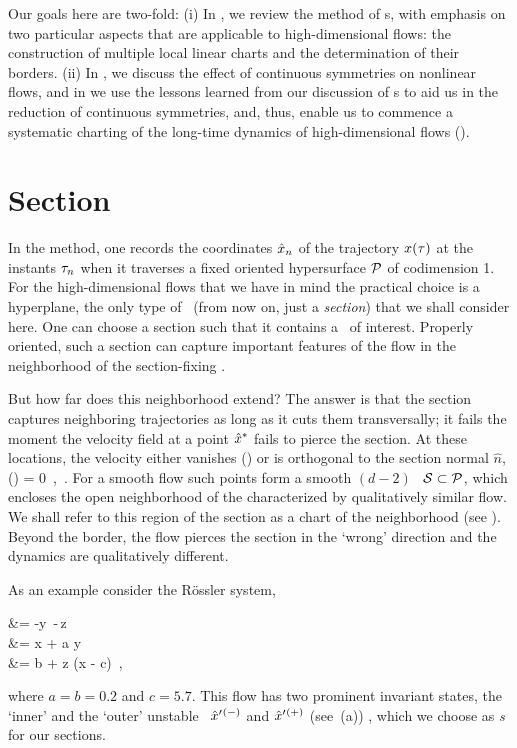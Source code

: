 \documentclass[aip,cha,reprint,
secnumarabic,
nofootinbib, tightenlines,
nobibnotes, showkeys, showpacs,
groupedaddress
]{revtex4-1}
\begin{document}
Our goals here are two-fold:
(i) In , we review the method of \PoincSec s, with
    emphasis on two particular aspects that are applicable to
    high-dimensional flows: the construction of multiple local linear
    charts and the determination of their borders.
(ii) In , we discuss the effect of continuous symmetries on
    nonlinear flows, and in  we use the lessons learned
    from our discussion of \PoincSec s to aid us in the reduction of
    continuous symmetries, and, thus, enable us to commence a systematic
    charting of the long-time dynamics of high-dimensional flows
    ().


\section{Section}
\label{s:cut}

In the {\em \PoincSec} method, one records the coordinates $\hat{x}_n$ of
the trajectory $x(\tau)$ at the instants $\tau_n$ when it traverses
a fixed oriented hypersurface ${\cal P}$ of codimension 1. For the
high-dimensional flows that we have in mind the practical choice is a
hyperplane, the only type of \PoincSec\ (from now on, just a
\emph{section}) that we shall consider here. One can choose a section
such that it contains a \template\ of interest. Properly oriented, such a
section can capture important features of the flow in the neighborhood of
the section-fixing \template.

But how far does this neighborhood extend? The answer is that the section
captures neighboring trajectories as long as it cuts them transversally;
it fails the moment the velocity field at a point $\hat{x}^\ast$ fails to
pierce the section. At these locations, the velocity either vanishes
(\eqv) or is orthogonal to the section normal $\hat{n}$,
\beq
     \cdot \vel(\sspRSing) = 0
\,,\qquad
    \sspRSing \in {}
\,.
For a smooth flow such points form a smooth $(d\!-\!2)$\dmn\
\emph{\poincBord} ${\cal S} \subset \PoincS$, which encloses the open
neighborhood of the {\template} characterized by qualitatively similar
flow. We shall refer to this region of the section as a chart of the
{\template} neighborhood (see \reffig{fig:RoessTrjs}). Beyond the border,
the flow pierces the section in the `wrong' direction and the dynamics
are qualitatively different.

As an example consider the R\"ossler system,
\beq
\begin{split}
   &= -y \,-\,z \\
   &= x + a y \\
   &= b + z (x - c)
  \,,
  \label{eq:Rossler}
\end{split}
\eeq
where $a = b = 0.2$ and $c = 5.7$. This flow has two prominent invariant
states, the `inner' and the `outer' unstable \eqva\ ${\hat{x}'}{}^{(-)}$ and
${\hat{x}'}{}^{(+)}$ (see \refFig{fig:RoessTrjs}\,(a)) , which we choose as
{\em \template s} for our sections.
\end{document}

